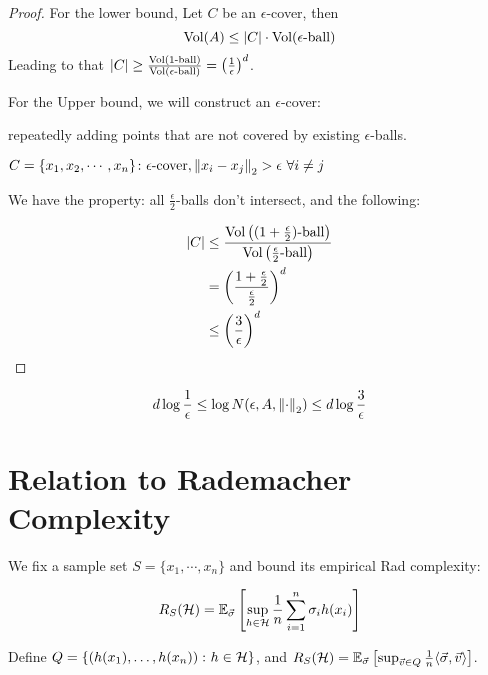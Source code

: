 \begin{proof}
    For the lower bound, Let \(C\) be an \(\epsilon\)-cover, then 
    \[
        \text{Vol}(A) \leq \lvert C \rvert \cdot \text{Vol} (\epsilon\text{-ball})  
    \]
    Leading to that \(\lvert C \rvert \geq \frac{\text{Vol}(1\text{-ball})}{\text{Vol}(\epsilon\text{-ball})}
    = \left(\frac{1}{\epsilon}\right)^d\). 

    For the Upper bound, we will construct an \(\epsilon\)-cover: 
    
    repeatedly adding points that are not covered by existing \(\epsilon\)-balls. 

    \(C = \{ x_1, x_2, \cdots, x_n \} \colon \epsilon\text{-cover}, \norm{x_i - x_j}_2 > \epsilon 
    \ \forall i \neq j\)

    We have the property: all \(\frac{\epsilon}{2}\)-balls don't intersect, and the following: 

    \begin{align*}
        \lvert C \rvert &\leq \frac{\text{Vol} \left(  (1 + \frac{\epsilon}{2})\text{-ball}  \right) }
        {\text{Vol} \left(  \frac{\epsilon}{2}\text{-ball}  \right)} \\ 
        &= \left(  \frac{ 1 + \frac{\epsilon}{2}  }{\frac{\epsilon}{2}}  \right)^d  \\ 
        &\leq \left(\frac{3}{\epsilon}\right)^d 
    \end{align*}
\end{proof}

\begin{remark}
    \[
        d \log \frac{1}{\epsilon} \leq \log N (\epsilon, A, \norm{\cdot}_2) \leq d \log \frac{3}{\epsilon}  
    \]
\end{remark}


\section{Relation to Rademacher Complexity}

We fix a sample set \(S = \{ x_1, \cdots, x_n \}\) and bound its empirical Rad complexity: 

\[
    R_S (\mathcal{H}) = \mathbb{E}_{\vec{\sigma}} \left[    \sup_{h \in \mathcal{H}} \frac{1}{n} \sum_{i=1}^n 
    \sigma_i h(x_i)  \right]
\]

Define \(Q = \{ \left( h(x_1), \ldots, h(x_n)  \right) \colon h \in \mathcal{H} \}\),  and  
\(R_S(\mathcal{H}) = \mathbb{E}_{\vec{\sigma}} \left[     \sup_{\vec{v} \in Q} \frac{1}{n} \langle \vec{\sigma
}, \vec{v} \rangle  \right]\). 

